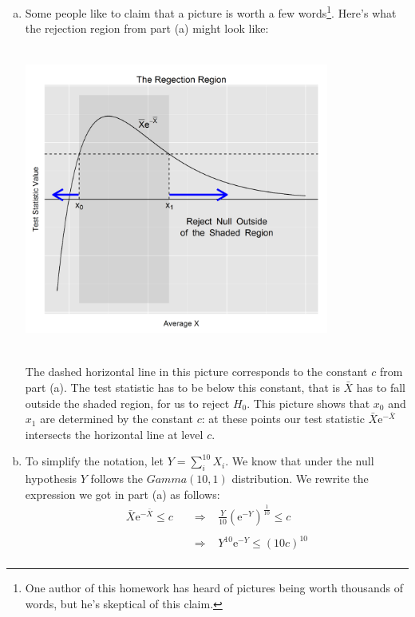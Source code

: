 \documentclass[12pt]{article}
\begin{document}
\begin{enumerate}[(a)]
\item
Some people like to claim that a picture is worth a few words\footnote{One author of this homework has heard of pictures being worth thousands of words, but he's skeptical of this claim.}. Here's what the rejection region from part (a) might look like:

\begin{center}
\includegraphics[width=10cm, height=10cm]{rejection_region_plot}
\end{center} 

The dashed horizontal line in this picture corresponds to the constant $c$ from part (a). The test statistic has to be below this constant, that is $\bar X$ has to fall outside the shaded region, for us to reject $H_0$. This picture shows that $x_0$ and $x_1$ are determined by the constant $c$: at these points our test statistic $\bar X \mathrm{e}^{-\bar X}$ intersects the horizontal line at level $c$.
\bigskip
\item
To simplify the notation, let $Y = \sum_i^{10} X_i$. We know that under the null hypothesis $Y$ follows the $Gamma(10, 1)$ distribution. We rewrite the expression we got in part (a) as follows:
\begin{align*}
\bar X \mathrm{e}^{-\bar X} \leq c \; \; \; &\Rightarrow \; \; \; \frac{Y}{10} (\mathrm{e}^{-Y})^{\frac{1}{10}} \leq c\\
\\
&\Rightarrow \; \; \; Y^{10} \mathrm{e}^{-Y} \leq (10 c)^{10} \\
\end{align*}


\end{enumerate}
\end{document}
